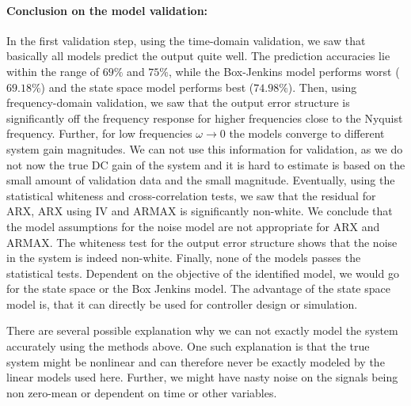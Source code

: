 \paragraph{Conclusion on the model validation: } In the first validation step, using the time-domain validation, we saw that basically all models predict the output quite well.
The prediction accuracies lie within the range of $69\%$ and $75\%$, while the Box-Jenkins model performs worst ($69.18\%$) and the state space model performs best ($74.98\%$).
Then, using frequency-domain validation, we saw that the output error structure is significantly off the frequency response for higher frequencies close to the Nyquist frequency.
Further, for low frequencies $\omega \rightarrow 0$ the models converge to different system gain magnitudes.
We can not use this information for validation, as we do not now the true DC gain of the system and it is hard to estimate is based on the small amount of validation data and the small magnitude.
Eventually, using the statistical whiteness and cross-correlation tests, we saw that the residual for ARX, ARX using IV and ARMAX is significantly non-white.
We conclude that the model assumptions for the noise model are not appropriate for ARX and ARMAX.
The whiteness test for the output error structure shows that the noise in the system is indeed non-white.
Finally, none of the models passes the statistical tests.
Dependent on the objective of the identified model, we would go for the state space or the Box Jenkins model.
The advantage of the state space model is, that it can directly be used for controller design or simulation.

There are several possible explanation why we can not exactly model the system accurately using the methods above.
One such explanation is that the true system might be nonlinear and can therefore never be exactly modeled by the linear models used here.
Further, we might have nasty noise on the signals being non zero-mean or dependent on time or other variables.




